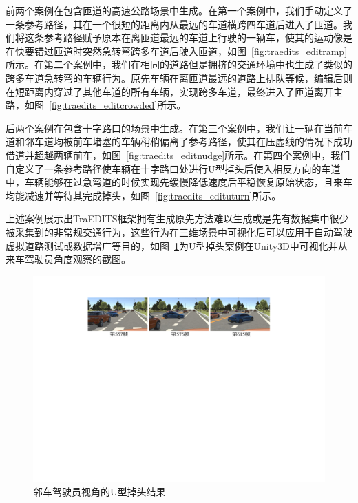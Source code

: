 前两个案例在包含匝道的高速公路场景中生成。在第一个案例中，我们手动定义了一条参考路径，其在一个很短的距离内从最远的车道横跨四车道后进入了匝道。我们将这条参考路径赋予原本在离匝道最远的车道上行驶的一辆车，使其的运动像是在快要错过匝道时突然急转弯跨多车道后驶入匝道，如图~\ref{fig:traedits_editramp}所示。在第二个案例中，我们在相同的道路但是拥挤的交通环境中也生成了类似的跨多车道急转弯的车辆行为。原先车辆在离匝道最远的道路上排队等候，编辑后则在短距离内穿过了其他车道的所有车辆，实现跨多车道，最终进入了匝道离开主路，如图~\ref{fig:traedits_editcrowded}所示。


后两个案例在包含十字路口的场景中生成。在第三个案例中，我们让一辆在当前车道和邻车道均被前车堵塞的车辆稍稍偏离了参考路径，使其在压虚线的情况下成功借道并超越两辆前车，如图~\ref{fig:traedits_editnudge}所示。在第四个案例中，我们自定义了一条参考路径使车辆在十字路口处进行U型掉头后使入相反方向的车道中，车辆能够在过急弯道的时候实现先缓慢降低速度后平稳恢复原始状态，且来车均能减速并等待其完成掉头，如图~\ref{fig:traedits_edituturn}所示。

上述案例展示出TraEDITS框架拥有生成原先方法难以生成或是先有数据集中很少被采集到的非常规交通行为，这些行为在三维场景中可视化后可以应用于自动驾驶虚拟道路测试或数据增广等目的，如图~\ref{fig:traedits_firstperson}为U型掉头案例在Unity3D中可视化并从来车驾驶员角度观察的截图。

\begin{figure}[!tbh]
\centering
\includegraphics[width=0.9\columnwidth]{figure/traedits/first person view 2_cn.pdf}
\caption[邻车驾驶员视角的U型掉头结果]{
邻车驾驶员视角的U型掉头结果
}
\label{fig:traedits_firstperson}
\end{figure}


